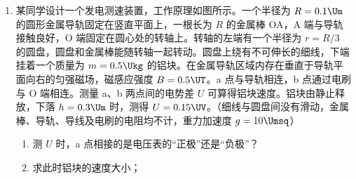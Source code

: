 \documentclass[\gkver]{gaokaozhenti}
\begin{document}
\begin{enumerate}

\item
某同学设计一个发电测速装置，工作原理如图所示。一个半径为 $R=0.1\Um$ 的圆形金属导轨固定在竖直平面上，一根长为 $R$ 的金属棒 OA，A 端与导轨接触良好，O 端固定在圆心处的转轴上。转轴的左端有一个半径为 $r=R/3$ 的圆盘，圆盘和金属棒能随转轴一起转动。圆盘上绕有不可伸长的细线，下端挂着一个质量为 $m=0.5\Ukg$ 的铝块。在金属导轨区域内存在垂直于导轨平面向右的匀强磁场，磁感应强度 $B=0.5\UT$。a 点与导轨相连，b 点通过电刷与 O 端相连。测量 a、b 两点间的电势差 $U$ 可算得铝块速度。铝块由静止释放，下落 $h=0.3\Um$ 时，测得 $U=0.15\UV$。（细线与圆盘间没有滑动，金属棒、导轨、导线及电刷的电阻均不计，重力加速度 $g=10\Umsq$）

\begin{enumerate}
	\item
	测 $U$ 时，a 点相接的是电压表的“正极”还是“负极”？

	\item
	求此时铝块的速度大小；


\end{enumerate}
\end{enumerate}
\end{document}
